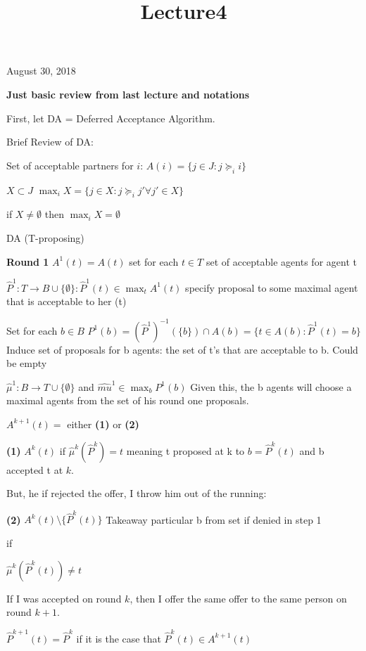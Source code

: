 \documentclass[11pt]{article}
\title{Lecture4}
\begin{document}
    
    
    \maketitle
    
    

    
    August 30, 2018

\textbf{Just basic review from last lecture and notations}

First, let DA = Deferred Acceptance Algorithm.

Brief Review of DA:

Set of acceptable partners for \(i\):
\(A(i) = \{j \in J: j \succeq_i i \}\)

\(X \subset J\)
\(\max_i X = \{j \in X: j \succeq_i j' \forall j' \in X \}\)

if \(X \ne \emptyset\) then \(\max_i X = \emptyset\)

DA (T-proposing)

\textbf{Round 1} \(A^1(t) = A(t)\) set for each \(t \in T\) set of
acceptable agents for agent t

\(\hat{P}^1: T \rightarrow B \cup \{\emptyset\} : \hat{P}^1(t) \in \max_t A^1(t)\)
specify proposal to some maximal agent that is acceptable to her (t)

Set for each \(b \in B\)
\(P^1(b) = (\hat{P}^1)^{-1}(\{b\}) \cap A(b) = \{t \in A(b): \hat{P}^1(t) = b\}\)
Induce set of proposals for b agents: the set of t's that are acceptable
to b. Could be empty

\(\hat{\mu}^1: B \rightarrow T \cup \{\emptyset\}\) and
\(\hat{mu}^1 \in \max_b P^1(b)\) Given this, the b agents will choose a
maximal agents from the set of his round one proposals.

    \(A^{k+1}(t) =\) either \textbf{(1)} or \textbf{(2)}

\textbf{(1)} \(A^k(t)\) if \(\hat{\mu}^k(\hat{P}^k) = t\) meaning t
proposed at k to \(b = \hat{P}^k(t)\) and b accepted t at \(k\).

But, he if rejected the offer, I throw him out of the running:

\textbf{(2)} \(A^k(t) \setminus \{\hat{P}^k(t)\}\) Takeaway particular b
from set if denied in step 1

if

\(\hat{\mu}^k(\hat{P}^k(t)) \ne t\)

If I was accepted on round \(k\), then I offer the same offer to the
same person on round \(k+1\).

\(\hat{P}^{k+1}(t) = \hat{P}^k\) if it is the case that
\(\hat{P}^k(t) \in A^{k+1}(t)\)
\end{document}
